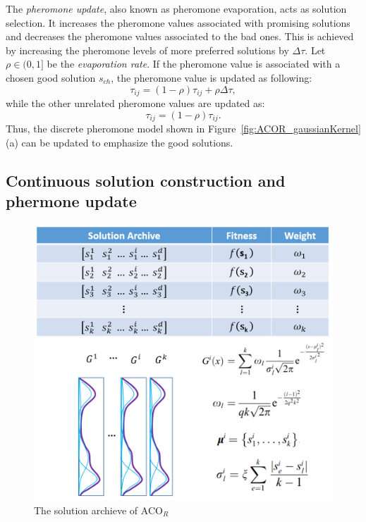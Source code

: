 The \textit{pheromone update}, also known as pheromone evaporation, acts as solution selection.
It increases the pheromone values associated with promising solutions and decreases the pheromone values associated to the bad ones.
This is achieved by increasing the pheromone levels of more preferred solutions by $\Delta \tau$.
Let $\rho \in (0,1]$ be the \textit{evaporation rate}.
If the pheromone value is associated with a chosen good solution $s_{ch}$, the pheromone value is updated as following:
\begin{displaymath}
\tau_{ij} = (1 - \rho) \tau_{ij} + \rho \Delta \tau,
\end{displaymath}
while the other unrelated pheromone values are updated as:
\begin{displaymath}
\tau_{ij} = (1 - \rho) \tau_{ij}.
\end{displaymath}
Thus, the discrete pheromone model shown in Figure~\ref{fig:ACOR_gaussianKernel}(a) can be updated to emphasize the good solutions.


\subsection{Continuous solution construction and phermone update}

\begin{figure}
\centering
\includegraphics[width=\textwidth]{ACOR_solution_archive}
\caption{The solution archieve of ACO$_R$}\label{fig:ACOR_solution_archive}
\end{figure}

